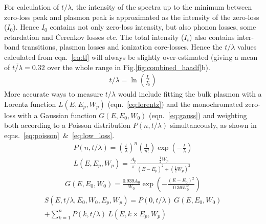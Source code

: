 \documentclass[%
aip,
rsi,%
 amsmath,amssymb,%
 reprint,%
]{revtex4-1}
\begin{document}
For calculation of $t/\lambda$, the intensity of the spectra up to the minimum between zero-loss peak and plasmon peak is approximated as the intensity of the zero-loss ($I_0$). Hence $I_0$ contains not only zero-loss intensity, but also phonon losses, some retardation and \v{C}erenkov losses etc. The total intensity ($I_t$) also contains inter-band transitions, plasmon losses and ionization core-losses. Hence the $t/\lambda$ values calculated from eqn.~\ref{eq:tl} will always be slightly over-estimated (giving a mean of $\overline{t/\lambda}=0.32$ over the whole range in Fig.\ref{fig:combined_haadf}b).
\begin{eqnarray}
	t/\lambda = \operatorname{ln}\left(\frac{I_t}{I_0}\right)
    \label{eq:tl}
\end{eqnarray}
More accurate ways to measure $t/\lambda$ would include fitting the bulk plasmon with a Lorentz function $L(E,E_p,W_p)$ (eqn.~\ref{eq:lorentz}) and the monochromated zero-loss with a Gaussian function $G(E,E_0,W_0)$ (eqn.~\ref{eq:gauss}) and weighting both according to a Poisson distribution $P(n,t/\lambda)$ simultaneously, as shown in eqns.~\ref{eq:poisson}~\&~\ref{eq:low_loss}.
\begin{eqnarray}
	P(n,t/\lambda) = \left(\frac{t}{\lambda}\right)^n\left(\frac{1}{n!}\right)\operatorname{exp}\left(-\frac{t}{\lambda}\right)
    \label{eq:poisson}\\
	L(E,E_p,W_p) = \frac{A_p}{\pi} \frac{\frac{1}{2}W_p}{(E-E_p)^2+\left(\frac{1}{2}W_p\right)^2}
    \label{eq:lorentz}
\end{eqnarray}
\begin{align}
	G(E,E_0,W_0) = \frac{0.939A_0}{W_0}\operatorname{exp}\left(-\frac{(E-E_0)^2}{0.36W_0^2}\right)
    \label{eq:gauss}
\end{align}
\begin{align}
	S(E,t/\lambda,E_0,W_0,E_p,W_p) = P(0,t/\lambda)~G(E,E_0,W_0) \nonumber \\
     +\sum_{k=1}^{n}P(k,t/\lambda)~L(E,k\times E_p,W_p)    \label{eq:low_loss}
\end{align}
\end{document}
